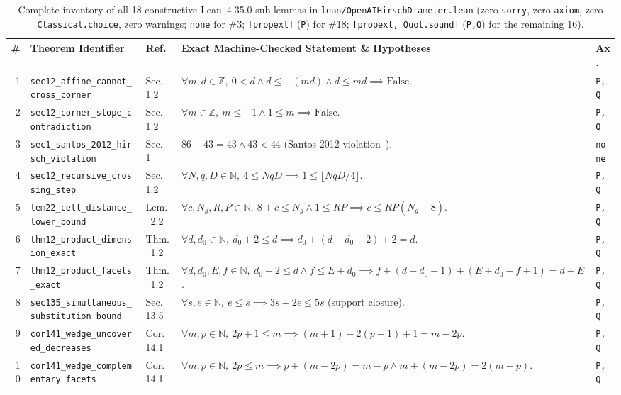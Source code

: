 \documentclass[10pt,twocolumn]{article}
\newcommand{\ZZ}{\mathbb{Z}}
\newcommand{\NN}{\mathbb{N}}
\begin{document}
\begin{table}[t]
\centering
\caption{Complete inventory of all 18 constructive Lean~4.35.0 sub-lemmas in \texttt{lean/OpenAIHirschDiameter.lean} (zero \texttt{sorry}, zero \texttt{axiom}, zero \texttt{Classical.choice}, zero warnings; \texttt{none} for \#3; \texttt{[propext]} (\texttt{P}) for \#18; \texttt{[propext, Quot.sound]} (\texttt{P,Q}) for the remaining 16).}
\label{tab:lean18}
\scriptsize
\setlength{\tabcolsep}{2.1pt}
\begin{tabular}{@{}r l l p{9.6cm} l@{}}
\toprule
\# & Theorem Identifier & Ref.~\cite{openai2026hirsch} & Exact Machine-Checked Statement \& Hypotheses & Ax. \\
\midrule
1 & \texttt{sec12\_affine\_cannot\_cross\_corner} & Sec.~1.2 & $\forall m,d\in\ZZ,\ 0<d \wedge d\le -(md) \wedge d\le md \implies \mathrm{False}$. & \texttt{P,Q} \\
2 & \texttt{sec12\_corner\_slope\_contradiction} & Sec.~1.2 & $\forall m\in\ZZ,\ m\le -1 \wedge 1\le m \implies \mathrm{False}$. & \texttt{P,Q} \\
3 & \texttt{sec1\_santos\_2012\_hirsch\_violation} & Sec.~1 & $86 - 43 = 43 \wedge 43 < 44$ (Santos 2012 violation~\cite{santos2012counterexample}). & \texttt{none} \\
4 & \texttt{sec12\_recursive\_crossing\_step} & Sec.~1.2 & $\forall N,q,D\in\NN,\ 4\le NqD \implies 1\le \lfloor NqD/4\rfloor$. & \texttt{P,Q} \\
5 & \texttt{lem22\_cell\_distance\_lower\_bound} & Lem.~2.2 & $\forall c,N_g,R,P\in\NN,\ 8+c\le N_g \wedge 1\le RP \implies c\le RP(N_g-8)$. & \texttt{P,Q} \\
6 & \texttt{thm12\_product\_dimension\_exact} & Thm.~1.2 & $\forall d,d_0\in\NN,\ d_0+2\le d \implies d_0+(d-d_0-2)+2 = d$. & \texttt{P,Q} \\
7 & \texttt{thm12\_product\_facets\_exact} & Thm.~1.2 & $\forall d,d_0,E,f\in\NN,\ d_0+2\le d \wedge f\le E+d_0 \implies f+(d-d_0-1)+(E+d_0-f+1)=d+E$. & \texttt{P,Q} \\
8 & \texttt{sec135\_simultaneous\_substitution\_bound} & Sec.~13.5 & $\forall s,e\in\NN,\ e\le s \implies 3s+2e\le 5s$ (support closure). & \texttt{P,Q} \\
9 & \texttt{cor141\_wedge\_uncovered\_decreases} & Cor.~14.1 & $\forall m,p\in\NN,\ 2p+1\le m \implies (m+1)-2(p+1)+1 = m-2p$. & \texttt{P,Q} \\
10 & \texttt{cor141\_wedge\_complementary\_facets} & Cor.~14.1 & $\forall m,p\in\NN,\ 2p\le m \implies p+(m-2p)=m-p \wedge m+(m-2p)=2(m-p)$. & \texttt{P,Q} \\

\end{tabular}
\end{table}
\end{document}
